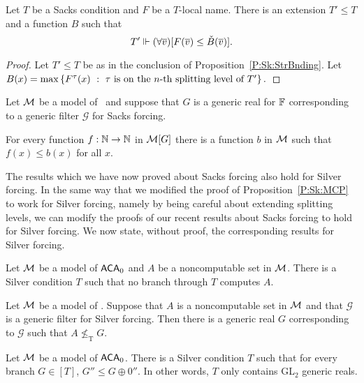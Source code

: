 \begin{cor}[\RCAo]\label{P:Sk:bndedNames}
Let $T$ be a Sacks condition and $F$ be a $T$-local name.
There is an extension $T'\leq T$ and a function $B$
such that $$T' \Vdash (\forall\overline{v})[F(\overline{v}) \leq \check{B}(\overline{v})].$$
\end{cor}
\begin{proof}
Let $T'\leq T$ be as in the conclusion of Proposition~\ref{P:Sk:StrBnding}.
Let \newline $B(x)=\max\left\{F^\tau(x)\ :\ \tau\text{ is on the }n\text{-th splitting level of }T'\right\}.$
\end{proof}

\begin{cor}
Let $\mathcal{M}$ be a model of \RCAo\
and suppose that $G$ is a generic real for $\mathbb{F}$
corresponding to a generic filter $\mathcal{G}$ for Sacks forcing.

For every function $f:\mathbb{N}\to\mathbb{N}$ in $\mathcal{M}[G]$
there is a function $b$ in $\mathcal{M}$ such that
$f(x)\leq b(x)$ for all $x$.
\end{cor}

The results which we have now proved about Sacks forcing
also hold for Silver forcing.
In the same way that we modified the proof of Proposition~\ref{P:Sk:MCP}
to work for Silver forcing, namely by being careful about extending splitting levels,
we can modify the proofs of our recent results about Sacks forcing to hold for Silver forcing.
We now state, without proof, the corresponding results for Silver forcing.

\begin{prop}\label{P:Sl:CAgeneric}
Let $\mathcal{M}$ be a model of $\mathsf{ACA}_0$ and $A$ be a noncomputable set in $\mathcal{M}$.
There is a Silver condition $T$ such that no branch through $T$ computes $A$.
\end{prop}

\begin{cor}
Let $\mathcal{M}$ be a model of \ACAo.
Suppose that $A$ is a noncomputable set in $\mathcal{M}$
and that $\mathcal{G}$ is a generic filter for Silver forcing.
Then there is a generic real $G$ corresponding to $\mathcal{G}$
such that $A\not\leq_{\text{T}}G$.
\end{cor}

\begin{prop}\label{P:Sl:GL2generic}
Let $\mathcal{M}$ be a model of $\mathsf{ACA}_0$.
There is a Silver condition $T$ such that for every branch $G\in[T]$,
$G''\leq G\oplus0''$.  In other words, $T$ only contains GL$_2$ generic reals.
\end{prop}

